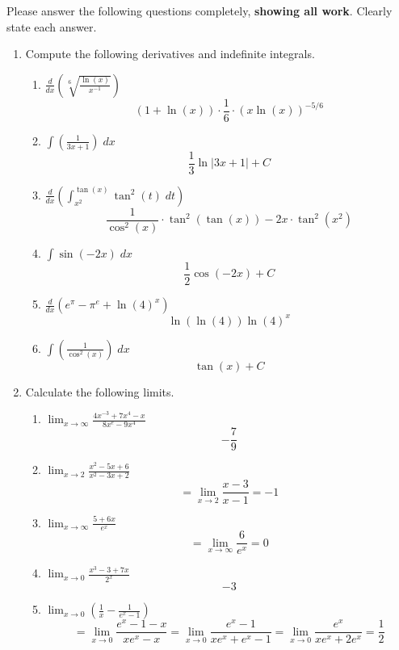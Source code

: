 \documentclass[11pt]{article}
\newcommand{\ds}{\displaystyle}
\begin{document}
\drawtitle

\noindent Please answer the following questions completely,
\textbf{showing all work}.  Clearly state each answer.

\begin{enumerate}
\item Compute the following derivatives and indefinite integrals.
  \begin{enumerate}
  \item $\ds\frac{d}{dx}\left(\sqrt[6]{\frac{\ln(x)}{x^{-1}}}\right)$
    \vfill
    \[
    (1+\ln(x))\cdot\frac{1}{6}\cdot (x\ln(x))^{-5/6}
    \]
    \vfill
  \item $\ds\int\left(\frac{1}{3x+1}\right)\;dx$
    \vfill
    \[
    \frac{1}{3}\ln|3x+1|+C
    \]
    \vfill
    \newpage
  \item $\ds\frac{d}{dx}\left(\int_{x^2}^{\tan(x)}\tan^2(t)\;dt\right)$
    \vfill
    \[
    \frac{1}{\cos^2(x)}\cdot\tan^2(\tan(x))-2x\cdot\tan^2(x^2)
    \]
    \vfill
  \item $\ds\int\sin\left(-2x\right)\;dx$
    \vfill
    \[
    \frac{1}{2}\cos(-2x)+C
    \]
    \vfill
    \newpage
  \item $\ds\frac{d}{dx}\left(e^{\pi}-\pi^e+\ln(4)^x\right)$
    \vfill
    \[
    \ln(\ln(4))\ln(4)^x
    \]
    \vfill
  \item $\ds\int\left(\frac{1}{\cos^2(x)}\right)\;dx$
    \vfill
    \[
    \tan(x)+C
    \]
    \vfill
  \end{enumerate}

  \newpage

\item Calculate the following limits.
  \begin{enumerate}
  \item $\ds\lim_{x\to \infty}\frac{4x^{-3}+7x^4-x}{8x^e-9x^4}$
    \vfill
    \[
    -\frac{7}{9}
    \]
    \vfill
  \item $\ds\lim_{x\to 2}\frac{x^2-5x+6}{x^2-3x+2}$
    \vfill
    \[
    =\lim_{x\to 2}\frac{x-3}{x-1}=-1
    \]
    \vfill
  \item $\ds\lim_{x\to \infty}\frac{5+6x}{e^x}$
    \vfill
    \[
    =\lim_{x\to\infty} \frac{6}{e^x}=0
    \]
    \vfill\newpage
  \item $\ds\lim_{x\to 0}\frac{x^3-3+7x}{2^x}$
    \vfill
    \[
    -3
    \]
    \vfill
  \item $\ds\lim_{x\to 0}\left(\frac{1}{x}-\frac{1}{e^x-1}\right)$
    \vfill
    \[
    =\lim_{x\to 0}\frac{e^x-1-x}{xe^x-x} =\lim_{x\to
      0}\frac{e^x-1}{xe^x+e^x-1} =\lim_{x\to
      0}\frac{e^x}{xe^x+2e^x}=\frac{1}{2}
    \]
    \vfill
  \end{enumerate}
  

\end{enumerate}
\end{document}
